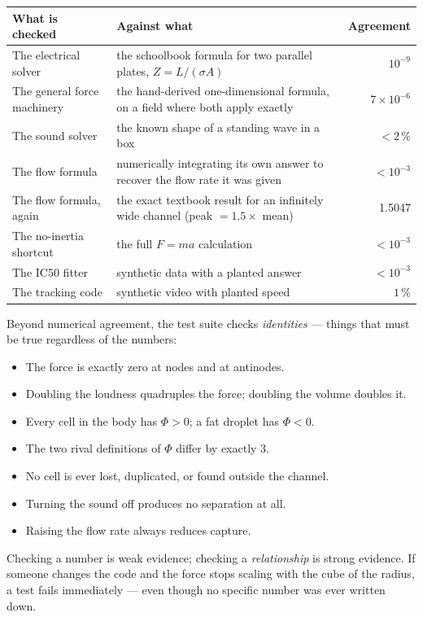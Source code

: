\documentclass[11pt,a4paper]{article}
\begin{document}
\begin{center}\small
\begin{tabular}{p{5.3cm}p{5.0cm}r}
\toprule
\textbf{What is checked} & \textbf{Against what} & \textbf{Agreement} \\
\midrule
The electrical solver & the schoolbook formula for two parallel plates,
$Z=L/(\sigma A)$ & $10^{-9}$ \\[3pt]
The general force machinery & the hand-derived one-dimensional formula, on a
field where both apply exactly & $7\times10^{-6}$ \\[3pt]
The sound solver & the known shape of a standing wave in a box & $<2\,\%$ \\[3pt]
The flow formula & numerically integrating its own answer to recover the flow
rate it was given & $<10^{-3}$ \\[3pt]
The flow formula, again & the exact textbook result for an infinitely wide
channel (peak $=1.5\times$ mean) & 1.5047 \\[3pt]
The no-inertia shortcut & the full $F=ma$ calculation & $<10^{-3}$ \\[3pt]
The IC50 fitter & synthetic data with a planted answer & $<10^{-3}$ \\[3pt]
The tracking code & synthetic video with planted speed & $1\,\%$ \\
\bottomrule
\end{tabular}
\end{center}

Beyond numerical agreement, the test suite checks \emph{identities} --- things
that must be true regardless of the numbers:

\begin{itemize}
\item The force is exactly zero at nodes and at antinodes.
\item Doubling the loudness quadruples the force; doubling the volume doubles it.
\item Every cell in the body has $\Phi>0$; a fat droplet has $\Phi<0$.
\item The two rival definitions of $\Phi$ differ by exactly 3.
\item No cell is ever lost, duplicated, or found outside the channel.
\item Turning the sound off produces no separation at all.
\item Raising the flow rate always reduces capture.
\end{itemize}

\begin{plain}
Checking a number is weak evidence; checking a \emph{relationship} is strong
evidence. If someone changes the code and the force stops scaling with the cube
of the radius, a test fails immediately --- even though no specific number was
ever written down.
\end{plain}
\end{document}
